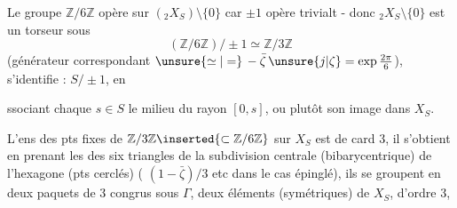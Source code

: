 
Le groupe $\mathbb Z/6\mathbb Z$ opère  sur $({}_2X_S)\setminus\{0\}$ car $\pm1$ opère trivialt - donc ${}_2X_S\setminus\{0\}$ est un torseur sous
\[
(\mathbb Z/6\mathbb Z)/\pm1\simeq\mathbb Z/3\mathbb Z
\]
 (générateur correspondant $\unsure{\simeq|=}\,-\bar\zeta\,\unsure{j|\zeta}=\exp\frac{2\pi}{6}$),
  s'identifie : $S/\pm1$, en
ssociant  chaque $s\in S$ le milieu du rayon $[0,s]$, ou plutôt son image dans\inserted{)} $X_S$.

L'ens des pts fixes de $\mathbb Z/3\mathbb Z\inserted{\subset\mathbb Z/6\mathbb Z}$ sur $X_S$ est de card 3, il s'obtient en prenant les  des six triangles de la subdivision centrale (bibarycentrique) de l'hexagone (pts cerclés) ( $(1-\bar\zeta)/3$ etc dans le cas épinglé), ils se groupent en deux paquets de 3  congrus sous $\Gamma$,  deux éléments (symétriques) de $X_S$, d'ordre 3,

